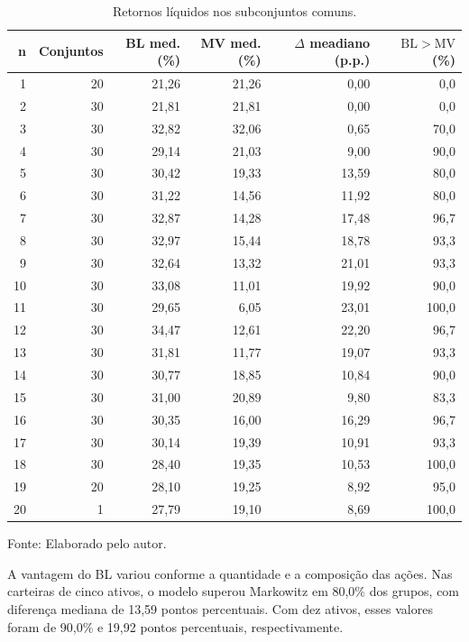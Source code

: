 \begin{table}[H]
\centering
\caption{Retornos líquidos nos subconjuntos comuns.}
\label{tab:retornos_comuns}
{\footnotesize
\begin{tabular}{@{}rrrrrr@{}}
\hline
n & Conjuntos & BL med. (\%) & MV med. (\%) & $\Delta$ meadiano (p.p.) & $\mathrm{BL} > \mathrm{MV}$ (\%) \\ \hline
1 & 20 & 21,26 & 21,26 & 0,00 & 0,0 \\
2 & 30 & 21,81 & 21,81 & 0,00 & 0,0 \\
3 & 30 & 32,82 & 32,06 & 0,65 & 70,0 \\
4 & 30 & 29,14 & 21,03 & 9,00 & 90,0 \\
5 & 30 & 30,42 & 19,33 & 13,59 & 80,0 \\
6 & 30 & 31,22 & 14,56 & 11,92 & 80,0 \\
7 & 30 & 32,87 & 14,28 & 17,48 & 96,7 \\
8 & 30 & 32,97 & 15,44 & 18,78 & 93,3 \\
9 & 30 & 32,64 & 13,32 & 21,01 & 93,3 \\
10 & 30 & 33,08 & 11,01 & 19,92 & 90,0 \\
11 & 30 & 29,65 & 6,05 & 23,01 & 100,0 \\
12 & 30 & 34,47 & 12,61 & 22,20 & 96,7 \\
13 & 30 & 31,81 & 11,77 & 19,07 & 93,3 \\
14 & 30 & 30,77 & 18,85 & 10,84 & 90,0 \\
15 & 30 & 31,00 & 20,89 & 9,80 & 83,3 \\
16 & 30 & 30,35 & 16,00 & 16,29 & 96,7 \\
17 & 30 & 30,14 & 19,39 & 10,91 & 93,3 \\
18 & 30 & 28,40 & 19,35 & 10,53 & 100,0 \\
19 & 20 & 28,10 & 19,25 & 8,92 & 95,0 \\
20 & 1 & 27,79 & 19,10 & 8,69 & 100,0 \\
\hline
\end{tabular}}
\par{}
\par
Fonte: Elaborado pelo autor.
\end{table}

A vantagem do BL variou conforme a quantidade e a composição
das ações. Nas carteiras de cinco ativos, o modelo superou
Markowitz em 80,0\% dos grupos, com diferença mediana de
13,59 pontos percentuais. Com dez ativos, esses valores
foram de 90,0\% e 19,92 pontos percentuais, respectivamente.


